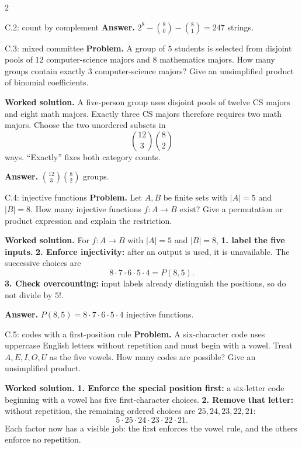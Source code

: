 \documentclass[10pt]{article}
\begin{document}
\begin{multicols}{2}
\begin{workedbox}{C.2: count by complement}
\textbf{Answer.} $2^8-\binom80-\binom81=247$ strings.
\end{workedbox}

\begin{workedbox}{C.3: mixed committee}
\textbf{Problem.} A group of $5$ students is selected from disjoint pools of $12$ computer-science majors and $8$ mathematics majors. How many groups contain exactly $3$ computer-science majors? Give an unsimplified product of binomial coefficients.

\textbf{Worked solution.} A five-person group uses disjoint pools of twelve CS majors and eight math
majors. Exactly three CS majors therefore requires two math majors. Choose
the two unordered subsets in
\[
\binom{12}{3}\binom82
\]
ways. ``Exactly'' fixes both category counts.

\textbf{Answer.} $\binom{12}{3}\binom82$ groups.
\end{workedbox}


\begin{workedbox}{C.4: injective functions}
\textbf{Problem.} Let $A,B$ be finite sets with $|A|=5$ and $|B|=8$. How many injective functions $f:A\to B$ exist? Give a permutation or product expression and explain the restriction.

\textbf{Worked solution.} For $f:A\to B$ with $|A|=5$ and $|B|=8$, \textbf{1. label the five inputs.}
\textbf{2. Enforce injectivity:} after an output is used, it is unavailable.
The successive choices are
\[
8\cdot7\cdot6\cdot5\cdot4=P(8,5).
\]
\textbf{3. Check overcounting:} input labels already distinguish the positions,
so do not divide by $5!$.

\textbf{Answer.} $P(8,5)=8\cdot7\cdot6\cdot5\cdot4$ injective functions.
\end{workedbox}

\begin{workedbox}{C.5: codes with a first-position rule}
\textbf{Problem.} A six-character code uses uppercase English letters without repetition and must begin with a vowel. Treat $A,E,I,O,U$ as the five vowels. How many codes are possible? Give an unsimplified product.

\textbf{Worked solution.} \textbf{1. Enforce the special position first:} a six-letter code beginning
with a vowel has five first-character choices. \textbf{2. Remove that letter:}
without repetition, the remaining ordered choices are $25,24,23,22,21$:
\[
5\cdot25\cdot24\cdot23\cdot22\cdot21.
\]
Each factor now has a visible job: the first enforces the vowel rule, and the
others enforce no repetition.


\end{workedbox}
\end{multicols}
\end{document}
